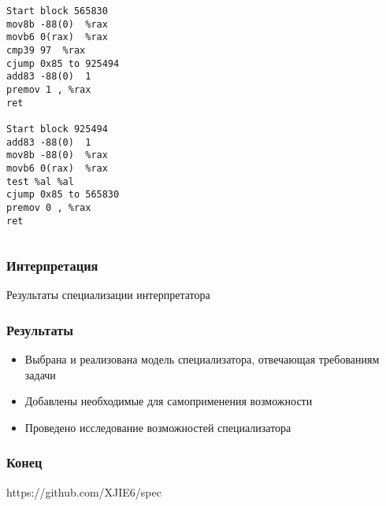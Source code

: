 \documentclass[demo]{beamer}
\begin{document}
\begin{frame}[fragile]
\begin{columns}
\begin{column}{0.4\textwidth}
\begin{lstlisting}
Start block 565830
mov8b -88(0)  %rax 
movb6 0(rax)  %rax 
cmp39 97  %rax 
cjump 0x85 to 925494
add83 -88(0)  1
premov 1 , %rax 
ret

Start block 925494
add83 -88(0)  1
mov8b -88(0)  %rax 
movb6 0(rax)  %rax 
test %al %al
cjump 0x85 to 565830
premov 0 , %rax 
ret
\end{lstlisting}
\end{column}
\end{columns}
\end{frame}

\begin{frame}\frametitle{Интерпретация}
Результаты специализации интерпретатора
\end{frame}

\begin{frame}\frametitle{Результаты}
\begin{itemize}
\item Выбрана и реализована модель специализатора, отвечающая требованиям задачи
\vfill
\item Добавлены необходимые для самоприменения возможности
\vfill
\item Проведено исследование возможностей специализатора
\end{itemize}
\end{frame}

\begin{frame}\frametitle{Конец}
https://github.com/XJIE6/spec
\end{frame}
\end{document}
